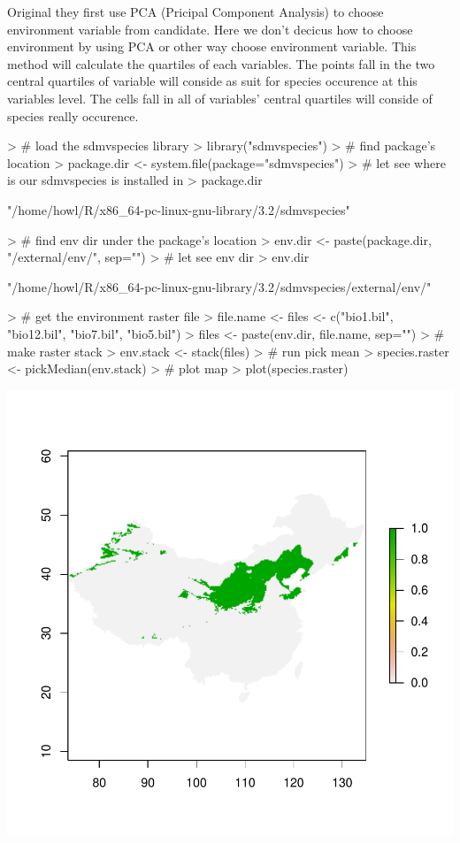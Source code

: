 \documentclass{report}
\begin{document}
Original they first use PCA (Pricipal Component Analysis) to choose environment variable from candidate.
Here we don't decicus how to choose environment by using PCA or other way choose environment variable.
This method will calculate the quartiles of each variables. The points fall in the two central quartiles of variable will conside as suit for species
occurence at this variables level. The cells fall in all of variables' central quartiles will conside of species really occurence.
\begin{Schunk}
\begin{Sinput}
> # load the sdmvspecies library
> library("sdmvspecies")
> # find package's location
> package.dir <- system.file(package="sdmvspecies")
> # let see where is our sdmvspecies is installed in
> package.dir
\end{Sinput}
\begin{Soutput}
[1] "/home/howl/R/x86_64-pc-linux-gnu-library/3.2/sdmvspecies"
\end{Soutput}
\begin{Sinput}
> # find env dir under the package's location
> env.dir <- paste(package.dir, "/external/env/", sep="")
> # let see env dir
> env.dir
\end{Sinput}
\begin{Soutput}
[1] "/home/howl/R/x86_64-pc-linux-gnu-library/3.2/sdmvspecies/external/env/"
\end{Soutput}
\begin{Sinput}
> # get the environment raster file
> file.name <- files <- c("bio1.bil", "bio12.bil", "bio7.bil", "bio5.bil")
> files <- paste(env.dir, file.name, sep="")
> # make raster stack
> env.stack <- stack(files)
> # run pick mean
> species.raster <- pickMedian(env.stack)
> # plot map
> plot(species.raster)
\end{Sinput}
\end{Schunk}
\includegraphics{sdmvspecies-pick_median_method}
\end{document}
